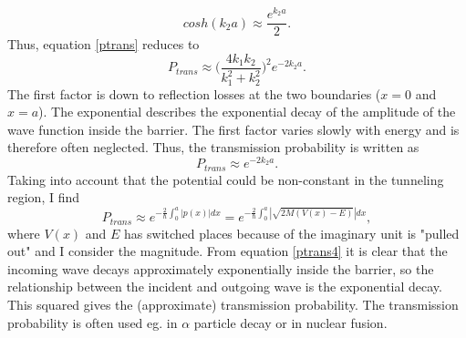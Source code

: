 \begin{example}
\begin{equation}
		cosh(k_2a)\approx\frac{e^{k_2a}}{2}.
	\end{equation} 
	Thus, equation \eqref{ptrans} reduces to
	\begin{equation}
		P_{trans}\approx\bigg(\frac{4k_1k_2}{k_1^2+k_2^2}\bigg)^2e^{-2k_2a}.
		\label{ptrans2}
	\end{equation} 
	The first factor is down to reflection losses at the two boundaries ($x=0$ and $x=a$). The exponential describes the exponential decay of the amplitude of the wave function inside the barrier. The first factor varies slowly with energy and is therefore often neglected. Thus, the transmission probability is written as
	\begin{equation}
		P_{trans}\approx e^{-2k_2a}.
		\label{ptrans3}
	\end{equation} 
	Taking into account that the potential could be non-constant in the tunneling region, I find
	\begin{equation}
		P_{trans}\approx e^{-\frac{2}{\hbar}\int_{0}^{a}|p(x)|dx}=e^{-\frac{2}{\hbar}\int_{0}^{a}|\sqrt{2M(V(x)-E)}|dx},
		\label{ptrans4}
	\end{equation} 
	where $V(x)$ and $E$ has switched places because of the imaginary unit is "pulled out" and I consider the magnitude. From equation \eqref{ptrans4} it is clear that the incoming wave decays approximately exponentially inside the barrier, so the relationship between the incident and outgoing wave is the exponential decay. This squared gives the (approximate) transmission probability. The transmission probability is often used eg. in $\alpha$ particle decay or in nuclear fusion.
\end{example}